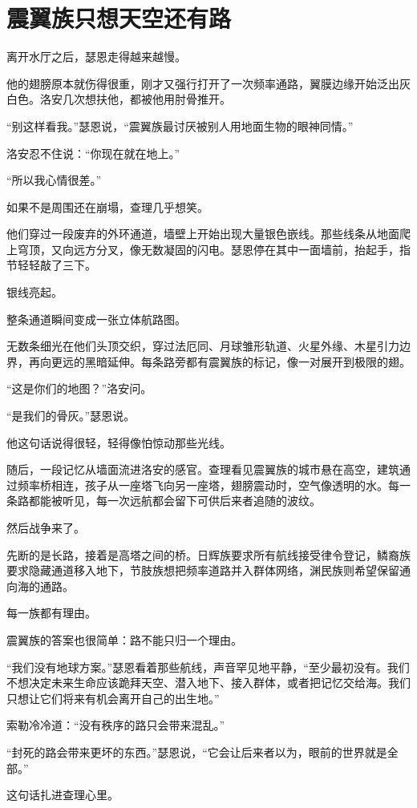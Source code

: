 \chapter{震翼族只想天空还有路}

离开水厅之后，瑟恩走得越来越慢。

他的翅膀原本就伤得很重，刚才又强行打开了一次频率通路，翼膜边缘开始泛出灰白色。洛安几次想扶他，都被他用肘骨推开。

“别这样看我。”瑟恩说，“震翼族最讨厌被别人用地面生物的眼神同情。”

洛安忍不住说：“你现在就在地上。”

“所以我心情很差。”

如果不是周围还在崩塌，查理几乎想笑。

他们穿过一段废弃的外环通道，墙壁上开始出现大量银色嵌线。那些线条从地面爬上穹顶，又向远方分叉，像无数凝固的闪电。瑟恩停在其中一面墙前，抬起手，指节轻轻敲了三下。

银线亮起。

整条通道瞬间变成一张立体航路图。

无数条细光在他们头顶交织，穿过法厄同、月球雏形轨道、火星外缘、木星引力边界，再向更远的黑暗延伸。每条路旁都有震翼族的标记，像一对展开到极限的翅。

“这是你们的地图？”洛安问。

“是我们的骨灰。”瑟恩说。

他这句话说得很轻，轻得像怕惊动那些光线。

随后，一段记忆从墙面流进洛安的感官。查理看见震翼族的城市悬在高空，建筑通过频率桥相连，孩子从一座塔飞向另一座塔，翅膀震动时，空气像透明的水。每一条路都能被听见，每一次远航都会留下可供后来者追随的波纹。

然后战争来了。

先断的是长路，接着是高塔之间的桥。日辉族要求所有航线接受律令登记，鳞裔族要求隐藏通道移入地下，节肢族想把频率道路并入群体网络，渊民族则希望保留通向海的通路。

每一族都有理由。

震翼族的答案也很简单：路不能只归一个理由。

“我们没有地球方案。”瑟恩看着那些航线，声音罕见地平静，“至少最初没有。我们不想决定未来生命应该跪拜天空、潜入地下、接入群体，或者把记忆交给海。我们只想让它们将来有机会离开自己的出生地。”

索勒冷冷道：“没有秩序的路只会带来混乱。”

“封死的路会带来更坏的东西。”瑟恩说，“它会让后来者以为，眼前的世界就是全部。”

这句话扎进查理心里。

